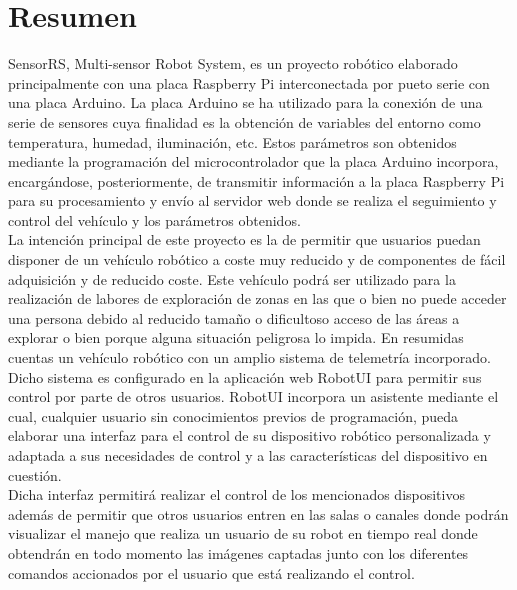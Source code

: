 

\section*{Resumen}
\label{resumen}

SensorRS, Multi-sensor Robot System, es un proyecto robótico elaborado principalmente con una placa Raspberry Pi interconectada por pueto serie con una placa Arduino. La placa Arduino
se ha utilizado para la conexión de una serie de sensores cuya finalidad es la obtención de variables del entorno como temperatura, humedad, iluminación, etc. Estos parámetros 
son obtenidos mediante la programación del microcontrolador que la placa Arduino incorpora, encargándose, posteriormente, de transmitir información a la placa Raspberry Pi
para su procesamiento y envío al servidor web donde se realiza el seguimiento y control del vehículo y los parámetros obtenidos.\\

La intención principal de este proyecto es la de permitir que usuarios puedan disponer de un vehículo robótico a coste muy reducido y de componentes de fácil adquisición y
de reducido coste. Este vehículo podrá ser utilizado para la realización de labores de exploración de zonas en las que o bien no puede acceder una persona debido al reducido tamaño o 
dificultoso acceso de las áreas a explorar o bien porque alguna situación peligrosa lo impida. En resumidas cuentas un vehículo robótico con un amplio sistema de telemetría incorporado.\\

Dicho sistema es configurado en la aplicación web RobotUI para permitir sus control por parte de otros usuarios. RobotUI incorpora un asistente mediante el cual, cualquier usuario 
sin conocimientos previos de programación, pueda elaborar una interfaz para el control de su dispositivo robótico personalizada y adaptada a sus necesidades de control 
y a las características del dispositivo en cuestión.\\

Dicha interfaz permitirá realizar el control de los mencionados dispositivos además de permitir que otros usuarios entren en las salas o canales donde podrán visualizar el manejo 
que realiza un usuario de su robot en tiempo real donde obtendrán en todo momento las imágenes captadas junto con los diferentes comandos accionados por el usuario 
que está realizando el control.\\


